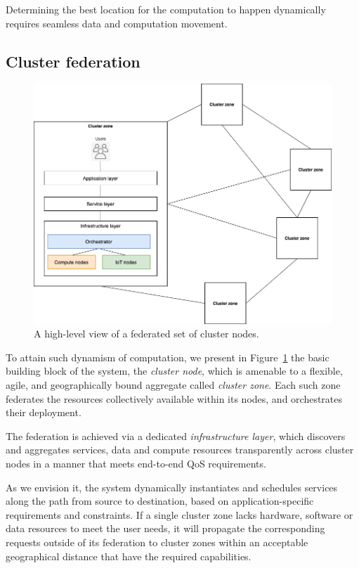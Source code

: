 Determining the best location for the computation to happen dynamically requires seamless data and computation movement. %

\subsection{Cluster federation}

\begin{figure}[ht]
\centering
\includegraphics[width=0.75\columnwidth]{figures/architecture-federation}
\caption{A high-level view of a federated set of cluster nodes.} \label{fig:architecture-federation}
\end{figure}

To attain such dynamism of computation, we present in Figure~\ref{fig:architecture-federation} 
the basic building block of the system, the \textit{cluster node}, which is amenable to a flexible, agile, and geographically bound aggregate called \textit{cluster zone}.
Each such zone federates the resources collectively available within its nodes, and orchestrates their deployment. 

The federation is achieved via a dedicated \textit{infrastructure layer}, which discovers and aggregates services, data and compute resources transparently across cluster nodes in a manner that meets end-to-end QoS requirements.

As we envision it, the system dynamically instantiates and schedules services along the path from source to destination, based on application-specific requirements and constraints. 
If a single cluster zone lacks hardware, software or data resources to meet the user needs, it will propagate the corresponding requests outside of its federation to cluster zones within an acceptable geographical distance that have the required capabilities.

